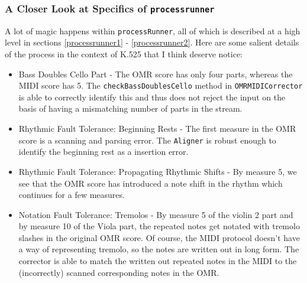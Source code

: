 \subsubsection{A Closer Look at Specifics of \texttt{processrunner}}
A lot of magic happens within \texttt{processRunner}, all of which is described at a high level in sections \ref{processrunner1} - \ref{processrunner2}. Here are some salient details of the process in the context of K.525 that I think deserve notice:
\begin{itemize}
\item Bass Doubles Cello Part - The OMR score has only four parts, whereas the MIDI score has 5. The \texttt{checkBassDoublesCello} method in \texttt{OMRMIDICorrector} is able to correctly identify this and thus does not reject the input on the basis of having a mismatching number of parts in the stream. 
\item Rhythmic Fault Tolerance: Beginning Rests - The first measure in the OMR score is a scanning and parsing error. The \texttt{Aligner} is robust enough to identify the beginning rest as a insertion error. 
\item Rhythmic Fault Tolerance: Propagating Rhythmic Shifts - By measure 5, we see that the OMR score has introduced a  note shift in the rhythm which continues for a few measures. 
\item Notation Fault Tolerance: Tremolos - By measure 5 of the violin 2 part and by measure 10 of the Viola part, the repeated  notes get notated with tremolo slashes in the original OMR score. Of course, the MIDI protocol doesn't have a way of representing tremolo, so the notes are written out in long form. The corrector is able to match the written out repeated notes in the MIDI to the (incorrectly) scanned corresponding notes in the OMR. 
\end{itemize}

